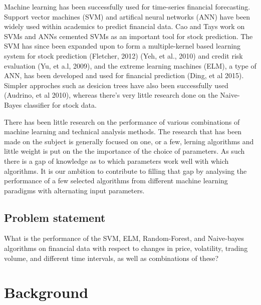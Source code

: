 \documentclass{article}
\begin{document}
Machine learning has been successfully used for time-series financial forecasting. Support vector machines (SVM) and artifical neural networks (ANN) have been widely used  within academics to predict financial data. Cao and Tays work on SVMs and ANNs cemented SVMs as an important tool for stock prediction. The SVM has since been expanded upon to form a multiple-kernel based learning system for stock prediction (Fletcher, 2012) (Yeh, et al., 2010) and credit risk evaluation (Yu, et a.l, 2009), and the extreme learning machines (ELM), a type of ANN, has been developed and used for financial prediction (Ding, et al 2015). Simpler approches such as desicion trees have also been successfully used (Audrino, et al 2010), whereas there's very little research done on the Naive-Bayes classifier for stock data.

There has been little research on the performance of various combinations of machine learning and technical analysis methods. The research that has been made on the subject is generally focused on one, or a few, lerning algorithms and little weight is put on the the importance of the choice of parameters. As such there is a gap of knowledge as to which parameters work well with which algorithms. It is our ambition to contribute to filling that gap by analysing the performance of a few selected algorithms from different machine learning paradigms with alternating input parameters.

\subsection{Problem statement}
What is the performance of the SVM, ELM, Random-Forest, and Naive-bayes algorithms on financial data with respect to changes in price, volatility, trading volume, and different time intervals, as well as combinations of these?


\section{Background}
\end{document}
